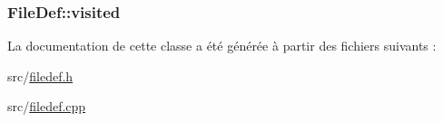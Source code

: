 \subsubsection[{visited}]{ File\+Def\+::visited}\label{class_file_def_ad5dd0c1f9f0df9b7f36abf6feea9c1a1}


La documentation de cette classe a été générée à partir des fichiers suivants \+:\begin{DoxyCompactItemize}
\item 
src/\hyperlink{filedef_8h}{filedef.\+h}\item 
src/\hyperlink{filedef_8cpp}{filedef.\+cpp}\end{DoxyCompactItemize}

